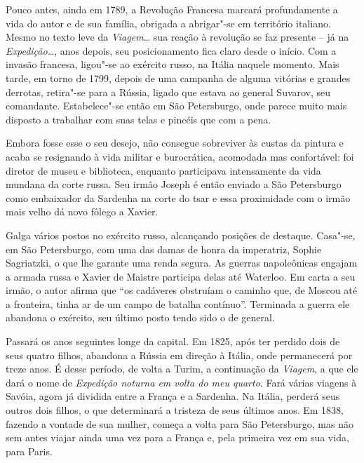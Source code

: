 Pouco antes, ainda em 1789, a Revolução Francesa marcará profundamente a
vida do autor e de sua família, obrigada a abrigar"-se em território
italiano. Mesmo no texto leve da \textit{Viagem\ldots} sua reação à
revolução se faz presente -- já na \textit{Expedição\ldots}, anos depois,
seu posicionamento fica claro desde o início. Com a invasão francesa,
ligou"-se ao exército russo, na Itália naquele momento. Mais tarde, em
torno de 1799, depois de uma campanha de alguma vitórias e grandes
derrotas, retira"-se para a Rússia, ligado que estava ao general
Suvarov, seu comandante. Estabelece"-se então em São Petersburgo, onde
parece muito mais disposto a trabalhar com suas telas e pincéis que com
a pena.

Embora fosse esse o seu desejo, não consegue sobreviver às custas da
pintura e acaba se resignando à vida militar e burocrática, acomodada
mas confortável: foi diretor de museu e biblioteca, enquanto
participava intensamente da vida mundana da corte russa. Seu irmão
Joseph é então enviado a São Petersburgo como embaixador da Sardenha na
corte do tsar e essa proximidade com o irmão mais velho dá novo fôlego
a Xavier. 

Galga vários postos no exército russo, alcançando posições de destaque.
Casa"-se, em São Petersburgo, com uma das damas de honra da imperatriz,
Sophie Sagriatzki, o que lhe garante uma renda segura. As guerras
napoleônicas engajam a armada russa e Xavier de Maistre participa delas
até Waterloo. Em carta a seu irmão, o autor afirma que ``os cadáveres
obstruíam o caminho que, de Moscou até a fronteira, tinha ar de um
campo de batalha contínuo''.  Terminada a guerra ele abandona o
exército, seu último posto tendo sido o de general. 

Passará os anos seguintes longe da capital. Em 1825, após ter perdido
dois de seus quatro filhos, abandona a Rússia em direção à Itália, onde
permanecerá por treze anos. É desse período, de volta a Turim, a
continuação da \textit{Viagem}, a que ele dará o nome de
\textit{Expedição noturna em volta do meu quarto}. Fará várias viagens
à Savóia, agora já dividida entre a França e a Sardenha. Na Itália,
perderá seus outros dois filhos, o que determinará a tristeza de seus
últimos anos. Em 1838, fazendo a vontade de sua mulher, começa a volta
para São Petersburgo, mas não sem antes viajar ainda uma vez para a
França e, pela primeira vez em sua vida, para Paris. 

